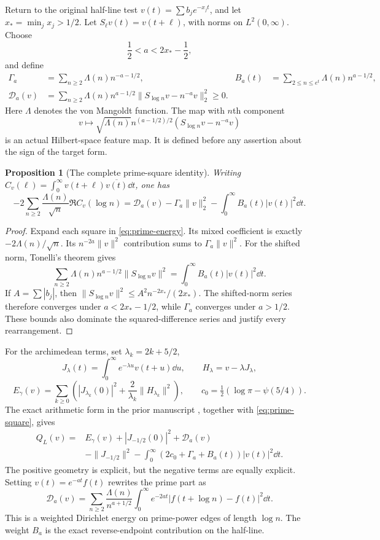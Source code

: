 \documentclass[11pt,letterpaper]{article}
\newtheorem{proposition}[theorem]{Proposition}
\theoremstyle{remark}\newtheorem{remark}[theorem]{Remark}
\numberwithin{equation}{section}
\begin{document}
Return to the original half-line test $v(t)=\sum b_j e^{-x_jt}$, and let $x_*=\min_jx_j>1/2$. Let $S_\ell v(t)=v(t+\ell)$, with norms on $L^2(0,\infty)$. Choose
\[
\frac12<a<2x_*-\frac12,
\]
and define
\begin{align}
\Gamma_a&=\sum_{n\ge2}\Lambda(n)n^{-a-1/2},&
B_a(t)&=\sum_{2\le n\le e^t}\Lambda(n)n^{a-1/2},\\
\mathcal D_a(v)&=\sum_{n\ge2}\Lambda(n)n^{a-1/2}
\|S_{\log n}v-n^{-a}v\|_2^2\ge0.\label{eq:prime-energy}
\end{align}
Here $\Lambda$ denotes the von Mangoldt function. The map with $n$th component
\[
v\longmapsto\sqrt{\Lambda(n)}n^{(a-1/2)/2}(S_{\log n}v-n^{-a}v)
\]
is an actual Hilbert-space feature map. It is defined before any assertion about the sign of the target form.

\begin{proposition}[The complete prime-square identity]\label{prop:prime-square}
Writing $C_v(\ell)=\int_0^\infty v(t+\ell)\overline{v(t)}\dd t$, one has
\begin{equation}\label{eq:prime-square}
-2\sum_{n\ge2}\frac{\Lambda(n)}{\sqrt n}\Re C_v(\log n)
=\mathcal D_a(v)-\Gamma_a\|v\|_2^2-
\int_0^\infty B_a(t)|v(t)|^2\dd t.
\end{equation}
\end{proposition}
\begin{proof}
Expand each square in \eqref{eq:prime-energy}. Its mixed coefficient is exactly $-2\Lambda(n)/\sqrt n$. Its $n^{-2a}\|v\|^2$ contribution sums to $\Gamma_a\|v\|^2$. For the shifted norm, Tonelli's theorem gives
\[
\sum_{n\ge2}\Lambda(n)n^{a-1/2}\|S_{\log n}v\|^2
=\int_0^\infty B_a(t)|v(t)|^2\dd t.
\]
If $A=\sum|b_j|$, then $\|S_{\log n}v\|^2\le A^2n^{-2x_*}/(2x_*)$. The shifted-norm series therefore converges under $a<2x_*-1/2$, while $\Gamma_a$ converges under $a>1/2$. These bounds also dominate the squared-difference series and justify every rearrangement.
\end{proof}

For the archimedean terms, set $\lambda_k=2k+5/2$,
\[
J_\lambda(t)=\int_0^\infty e^{-\lambda u}v(t+u)\dd u,
\qquad H_\lambda=v-\lambda J_\lambda,
\]
\[
E_\gamma(v)=\sum_{k\ge0}\left(|J_{\lambda_k}(0)|^2+
\frac2{\lambda_k}\|H_{\lambda_k}\|^2\right),\qquad
c_0=\tfrac12(\log\pi-\psi(5/4)).
\]
The exact arithmetic form in the prior manuscript \cite[Section 3]{project}, together with \eqref{eq:prime-square}, gives
\begin{align}\label{eq:full-graph}
Q_L(v)={}&E_\gamma(v)+|J_{-1/2}(0)|^2+\mathcal D_a(v)\\
&-\|J_{-1/2}\|^2-
\int_0^\infty(2c_0+\Gamma_a+B_a(t))|v(t)|^2\dd t.\nonumber
\end{align}
The positive geometry is explicit, but the negative terms are equally explicit. Setting $v(t)=e^{-at}f(t)$ rewrites the prime part as
\[
\mathcal D_a(v)=\sum_{n\ge2}\frac{\Lambda(n)}{n^{a+1/2}}
\int_0^\infty e^{-2at}|f(t+\log n)-f(t)|^2\dd t.
\]
This is a weighted Dirichlet energy on prime-power edges of length $\log n$. The weight $B_a$ is the exact reverse-endpoint contribution on the half-line.
\end{document}
